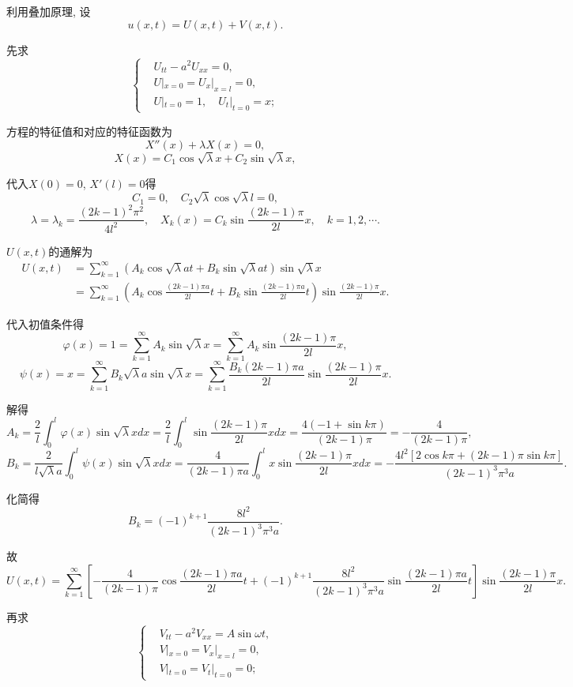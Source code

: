 \documentclass[11pt,a4paper]{article}
\begin{document}
利用叠加原理, 设$$u(x,t)=U(x,t)+V(x,t).$$

先求
$$
  \left\{\begin{aligned}
     & U_{tt}-a^2U_{xx}=0,            \\
     & U|_{x=0}=U_x|_{x=l}=0,         \\
     & U|_{t=0}=1,\quad U_t|_{t=0}=x;
  \end{aligned}\right.
$$

方程的特征值和对应的特征函数为
$$X''(x)+\lambda X(x)=0,$$
$$X(x)=C_1\cos\sqrt{\lambda}x+C_2\sin\sqrt{\lambda}x,$$

代入$X(0)=0$, $X'(l)=0$得
$$C_1=0,\quad C_2\sqrt{\lambda}\cos\sqrt{\lambda}l=0,$$
$$\lambda=\lambda_k=\frac{(2k-1)^2\pi^2}{4l^2},\quad X_k(x)=C_k\sin\frac{(2k-1)\pi}{2l}x,\quad k=1,2,\cdots.$$

$U(x,t)$的通解为
\begin{align*}
  U(x,t)
   & =\sum_{k=1}^\infty\left(A_k\cos\sqrt{\lambda}at+
  B_k\sin\sqrt{\lambda}at\right)\sin\sqrt{\lambda}x          \\
   & =\sum_{k=1}^\infty\left(A_k\cos\frac{(2k-1)\pi a}{2l}t+
  B_k\sin\frac{(2k-1)\pi a}{2l}t\right)\sin\frac{(2k-1)\pi}{2l}x.
\end{align*}

代入初值条件得
$$\varphi(x)=1=\sum_{k=1}^\infty A_k\sin\sqrt{\lambda}x=\sum_{k=1}^\infty A_k\sin\frac{(2k-1)\pi }{2l}x,$$
$$\psi(x)=x=\sum_{k=1}^\infty B_k\sqrt{\lambda}a\sin\sqrt{\lambda}x=\sum_{k=1}^\infty \frac{B_k(2k-1)\pi a}{2l}\sin\frac{(2k-1)\pi}{2l}x.$$

解得
$$A_k=\frac{2}{l}\int_0^l\varphi(x)\sin\sqrt{\lambda}xdx=\frac{2}{l}\int_0^l\sin\frac{(2k-1)\pi}{2l}xdx=\frac{4(-1+\sin k\pi)}{(2k-1)\pi}=-\frac{4}{(2k-1)\pi},$$
$$B_k=\frac{2}{l\sqrt{\lambda}a}\int_0^l\psi(x)\sin\sqrt{\lambda}xdx=
  \frac{4}{(2k-1)\pi a}\int_0^l x\sin\frac{(2k-1)\pi}{2l}xdx=-\frac{4l^2[2\cos k\pi+(2k-1)\pi\sin k\pi]}{(2k-1)^3\pi^3a}.$$

化简得
$$B_k=(-1)^{k+1}\frac{8l^2}{(2k-1)^3\pi^3a}.$$

故
$$U(x,t)=\sum_{k=1}^\infty\left[-\frac{4}{(2k-1)\pi}\cos\frac{(2k-1)\pi a}{2l}t+
    (-1)^{k+1}\frac{8l^2}{(2k-1)^3\pi^3a}\sin\frac{(2k-1)\pi a}{2l}t\right]\sin\frac{(2k-1)\pi}{2l}x.$$

再求
$$
  \left\{\begin{aligned}
     & V_{tt}-a^2V_{xx}=A\sin\omega t, \\
     & V|_{x=0}=V_x|_{x=l}=0,          \\
     & V|_{t=0}=V_t|_{t=0}=0;
  \end{aligned}\right.
$$
\end{document}
